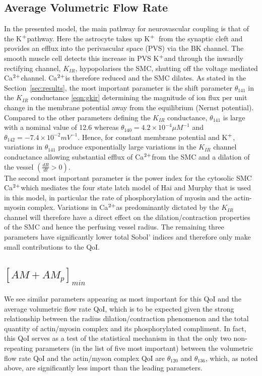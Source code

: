 \documentclass[smallextended]{svjour3}
\numberwithin{equation}{section}
\newcommand{\ca}{Ca$^{\text{\scriptsize 2+}}$}
\newcommand{\pot}{K$^{\text{\scriptsize +}}$}
\begin{document}
\subsection{Average Volumetric Flow Rate}
In the presented model, the main pathway for neurovascular coupling is that of the \pot pathway. Here the astrocyte takes up \pot ~from the synaptic cleft and provides an efflux into the perivascular space (PVS) via the BK channel. The smooth muscle cell detects this increase in PVS \pot and through the inwardly rectifying channel, $K_{IR}$, hypopolarises the SMC, shutting off the voltage mediated \ca channel.  \ca is therefore reduced and the SMC dilates. As stated in the Section~\ref{sec:results}, the most important parameter is the shift parameter $\theta_{141}$ in the $K_{IR}$ conductance \eqref{eqn:gkir} determining the magnitude of ion flux per unit change in the membrane potential away from the equilibrium (Nernst potential).  Compared to the other parameters defining the $K_{IR}$ conductance, $\theta_{141}$ is large with a nominal value of 12.6 whereas $\theta_{140}=4.2 \times 10^{-4} \mu M^{-1}$ and $\theta_{142} = -7.4 \times10^{-2} mV^{-1}$. Hence, for constant membrane potential and \pot,   variations in $\theta_{141}$ produce exponentially large variations in the $K_{IR}$ channel conductance allowing substantial efflux of \ca from the SMC and a dilation of the vessel $\left(\frac{dR}{dt}> 0\right)$. \\

The second most important parameter is the power index for the cytosolic SMC \ca which mediates the four state latch model of Hai and Murphy \cite{Hai1988} that is used in this model, in particular the rate of phosphorylation of  myosin and the actin-myosin complex.  Variations in \ca as predominantly dictated by the $K_{IR}$ channel will therefore have a direct effect on the dilation/contraction properties of the SMC and hence the perfusing vessel radius.  
The remaining three parameters have significantly lower total Sobol' indices and therefore only make small contributions to the QoI.
 
\subsection{$[AM+AM_p]_{min}$}
We see similar parameters appearing as most important for this QoI and the average volumetric flow rate QoI, which is to be expected given the strong relationship between the radius dilation/contraction phenomenon and the total quantity of actin/myosin complex and its phosphorylated compliment. In fact, this QoI serves as a test of the statistical mechanism in that the only two non-repeating parameters (in the list of five most important) between the volumetric flow rate QoI and the actin/myson complex QoI are $\theta_{120}$ and $\theta_{136}$, which, as noted above, are significantly less import than the leading parameters.
\end{document}
